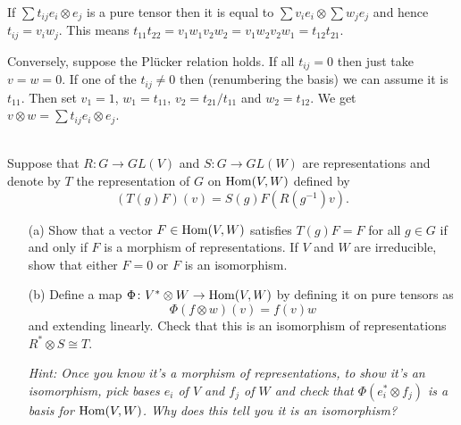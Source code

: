\documentclass[12pt]{article}
\begin{document}
\begin{answer}
If $\sum t_{ij}e_i\otimes e_j$ is a pure tensor then it is equal to $\sum v_ie_i \otimes \sum w_je_j$ and hence $t_{ij}=v_iw_j$. This means $t_{11}t_{22}=v_1w_1v_2w_2=v_1w_2v_2w_1=t_{12}t_{21}$.

Conversely, suppose the Pl\"{u}cker relation holds. If all $t_{ij}=0$ then just take $v=w=0$. If one of the $t_{ij}\neq 0$ then (renumbering the basis) we can assume it is $t_{11}$. Then set $v_1=1$, $w_1=t_{11}$, $v_2=t_{21}/t_{11}$ and $w_2=t_{12}$. We get $v\otimes w=\sum t_{ij}e_i\otimes e_j$.
\end{answer}
\newpage

\bigskip

\begin{question}\ \\
Suppose that $R\colon G\to GL(V)$ and $S\colon G\to GL(W)$ are representations and denote by $T$ the representation of $G$ on $\operatorname{Hom}(V,W)$ defined by
\[(T(g)F)(v)=S(g)F(R(g^{-1})v).\]
\begin{enumerate}
\item[(a)] Show that a vector $F\in\operatorname{Hom}(V,W)$ satisfies $T(g)F=F$ for all $g\in G$ if and only if $F$ is a morphism of representations. If $V$ and $W$ are irreducible, show that either $F=0$ or $F$ is an isomorphism.
\item[(b)] Define a map $\Phi\colon V^*\otimes W\to\operatorname{Hom}(V,W)$ by defining it on pure tensors as
\[\Phi(f\otimes w)(v)=f(v)w\]
and extending linearly. Check that this is an isomorphism of representations $R^*\otimes S\cong T$.

{\em Hint: Once you know it's a morphism of representations, to show it's an isomorphism, pick bases $e_i$ of $V$ and $f_j$ of $W$ and check that $\Phi(e_i^*\otimes f_j)$ is a basis for $\operatorname{Hom}(V,W)$. Why does this tell you it is an isomorphism?}
\end{enumerate}
\end{question}
\end{document}
